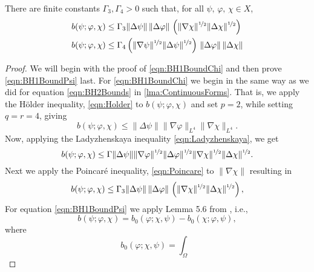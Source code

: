 \begin{lemma} \label{lma:BH1Bound}
  There are finite constants $\Gamma_3,\Gamma_4>0$ such that, for all
  $\psi,\, \varphi,\, \chi \in X$,
  \begin{align}
    b(\psi;\varphi,\chi) &\le \Gamma_3 \|\Delta \psi\|\, \|\Delta \varphi\|\,
      \left(\|\nabla \chi\|^{\nicefrac{1}{2}}
      \|\Delta \chi\|^{\nicefrac{1}{2}}\right) \label{eqn:BH1BoundChi} \\
    b(\psi;\varphi,\chi) &\le \Gamma_4 \left(\|\nabla \psi\|^{\nicefrac{1}{2}}
      \|\Delta \psi\|^{\nicefrac{1}{2}}\right)\,
      \|\Delta \varphi\|\, \|\Delta \chi\| \label{eqn:BH1BoundPsi}
  \end{align}
\end{lemma}
\begin{proof}
  We will begin with the proof of \eqref{eqn:BH1BoundChi} and then prove
  \eqref{eqn:BH1BoundPsi} last. For \eqref{eqn:BH1BoundChi} we begin in the same
  way as we did for equation \eqref{eqn:BH2Bounds} in \autoref{lma:ContinuousForms}.
  That is, we apply the H\"older inequality, \eqref{eqn:Holder} to $b(\psi;
  \varphi, \chi)$ and set $p=2$, while setting $q=r=4$, giving
  \begin{equation*}
    b(\psi;\varphi,\chi) \le \|\Delta \psi\| \|\nabla \varphi\|_{L^4} \|\nabla
      \chi\|_{L^4}.
  \end{equation*}
  Now, applying the Ladyzhenskaya inequality \eqref{eqn:Ladyzhenskaya}, we get
  \begin{equation*}
    b(\psi;\varphi,\chi) \le \Gamma \|\Delta \psi\|
      \|\nabla \varphi\|^{\nicefrac{1}{2}} \|\Delta \varphi\|^{\nicefrac{1}{2}}
      \|\nabla \chi\|^{\nicefrac{1}{2}} \|\Delta \chi\|^{\nicefrac{1}{2}}.
  \end{equation*}
  Next we apply the Poincar\'e inequality, \eqref{eqn:Poincare} to $\|\nabla \chi\|$ resulting in
  \begin{equation*}
    b(\psi;\varphi,\chi) \le \Gamma_3 \|\Delta \psi\|\, \|\Delta \varphi\|\,
      \left(\|\nabla \chi\|^{\nicefrac{1}{2}}
      \|\Delta \chi\|^{\nicefrac{1}{2}}\right),
  \end{equation*}
  For equation \eqref{eqn:BH1BoundPsi} we apply Lemma 5.6 from \cite{Fairag98},
  i.e.,
  \begin{equation*}
    b(\psi; \varphi, \chi) = b_0(\varphi; \chi, \psi) - b_0(\chi; \varphi, \psi),
  \end{equation*}
  where
  \begin{equation}
    b_0(\varphi;\chi,\psi) = \int_{\Omega}\!

\end{equation}
\end{proof}
